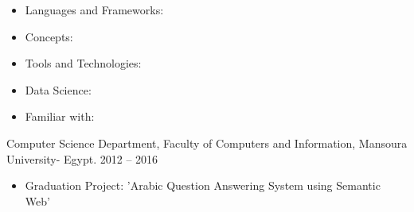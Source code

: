 \documentclass[10pt,a4paper]{altacv}
\begin{document}


\smallskip

\begin{itemize}
\item Languages and Frameworks:
\end{itemize}

\begin{itemize}
\item Concepts:
\end{itemize}

\begin{itemize}
\item Tools and Technologies:
\end{itemize}

\begin{itemize}
\item Data Science:
\end{itemize}

\begin{itemize}
\item Familiar with:
\end{itemize}



 {Computer Science Department, Faculty of Computers and Information, Mansoura University- Egypt.}{ 2012 -- 2016 \hspace{1 cm} }{}

\begin{itemize}
\item Graduation Project: 'Arabic Question Answering System using Semantic Web'
\end{itemize}
\end{document}
